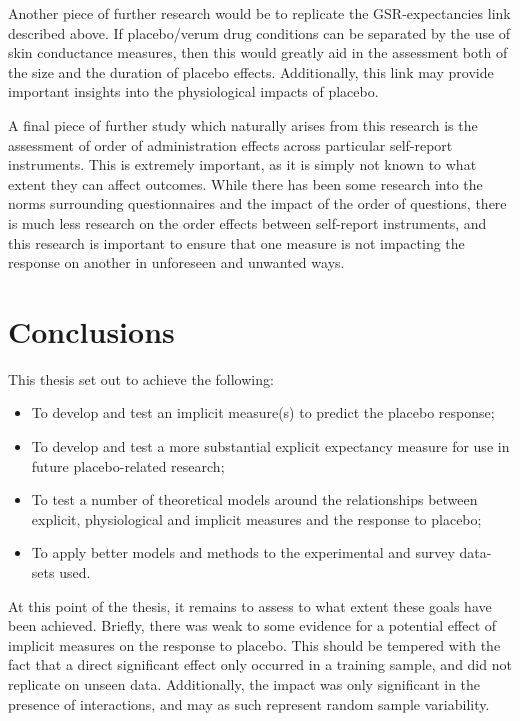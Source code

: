 Another piece of further research would be to replicate the GSR-expectancies link described above. If placebo/verum drug conditions can be separated by the use of skin conductance measures, then this would greatly aid in the assessment both of the size and the duration of placebo effects. Additionally, this link may provide important insights into the physiological impacts of placebo. 

A final piece of further study which naturally arises from this research is the assessment of order of administration effects across particular self-report instruments. This is extremely important, as it is simply not known to what extent they can affect outcomes. While there has been some research into the norms surrounding questionnaires and the impact of the order of questions, there is much less research on the order effects between self-report instruments, and this research is important to ensure that one measure is not impacting the response on another in unforeseen and unwanted ways. 


\section{Conclusions}
\label{sec:concl-furth-rese}


This thesis set out to achieve the following:

\begin{itemize}
\item To develop and test an implicit measure(s) to predict the
placebo response;
\item To develop and test a more substantial explicit expectancy
measure for use in future placebo-related research;
\item To test a number of theoretical models around the relationships
between explicit, physiological and implicit measures and the response
to placebo;
\item To apply better models and methods to the experimental and survey data-sets used.
\end{itemize}

At this point of the thesis, it remains to assess to what extent these
goals have been achieved. Briefly, there was weak to some evidence for
a potential effect of implicit measures on the response to placebo.
This should be tempered with the fact that a direct significant effect
only occurred in a training sample, and did not replicate on unseen
data. Additionally, the impact was only significant in the presence of
interactions, and may as such represent random sample variability.

